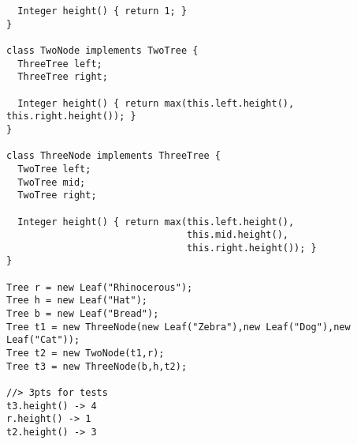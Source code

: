 \documentclass[12pt]{article}                   %
\newenvironment{solution}{\color{red}}{}
\begin{document}
\begin{problem}
\begin{solution}
\begin{verbatim}
  Integer height() { return 1; }
}

class TwoNode implements TwoTree {
  ThreeTree left;
  ThreeTree right;

  Integer height() { return max(this.left.height(), this.right.height()); }
}

class ThreeNode implements ThreeTree {
  TwoTree left;
  TwoTree mid;
  TwoTree right;

  Integer height() { return max(this.left.height(),
                                this.mid.height(),
                                this.right.height()); }
}

Tree r = new Leaf("Rhinocerous");
Tree h = new Leaf("Hat");
Tree b = new Leaf("Bread");
Tree t1 = new ThreeNode(new Leaf("Zebra"),new Leaf("Dog"),new Leaf("Cat"));
Tree t2 = new TwoNode(t1,r);
Tree t3 = new ThreeNode(b,h,t2);

//> 3pts for tests
t3.height() -> 4
r.height() -> 1
t2.height() -> 3
\end{verbatim}
\end{solution}
\end{problem}
\newpage
\end{document}
